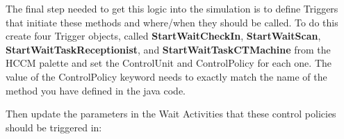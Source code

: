 \documentclass[
  10pt,
  a4paperpaper,
  DIV=11,
  numbers=noendperiod,
  oneside]{scrreprt}
\begin{document}
The final step needed to get this logic into the simulation is to define
Triggers that initiate these methods and where/when they should be
called. To do this create four Trigger objects, called
\textbf{StartWaitCheckIn}, \textbf{StartWaitScan},
\textbf{StartWaitTaskReceptionist}, and \textbf{StartWaitTaskCTMachine}
from the HCCM palette and set the ControlUnit and ControlPolicy for each
one. The value of the ControlPolicy keyword needs to exactly match the
name of the method you have defined in the java code.

\begin{table}

\caption{\label{tbl-trig_params}Trigger Parameters}


\end{table}%

Then update the parameters in the Wait Activities that these control
policies should be triggered in:
\end{document}
